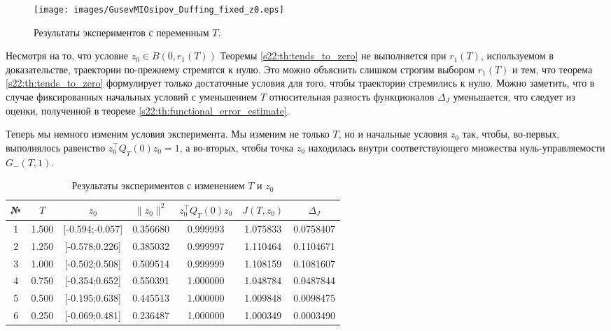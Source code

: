 \documentclass[../main.tex]{subfiles}
\begin{document}
\begin{figure}
    \centering
    \texttt{[image: images/GusevMIOsipov\_Duffing\_fixed\_z0.eps]}
    \caption{Результаты экспериментов с переменным $T$.}
    \label{s22:fig:series1}
\end{figure}

Несмотря на то, что условие $z_0 \in B(0,r_1(T))$ Теоремы \ref{s22:th:tends_to_zero} не выполняется при $r_1(T)$, используемом в доказательстве, траектории по-прежнему стремятся к нулю. 
Это можно объяснить слишком строгим выбором $r_1(T)$ и тем, что теорема \ref{s22:th:tends_to_zero} формулирует только достаточные условия для того, чтобы траектории стремились к нулю. 
Можно заметить, что в случае фиксированных начальных условий с уменьшением $T$ относительная разность функционалов $\Delta_J$ уменьшается, что следует из оценки, полученной в теореме \ref{s22:th:functional_error_estimate}.

Теперь мы немного изменим условия эксперимента. 
Мы изменим не только $T$, но и начальные условия $z_0$ так, чтобы, во-первых, выполнялось равенство 
$z_0^{\top} Q_T(0) z_0 = 1$, а во-вторых, чтобы точка $z_0$ находилась внутри 
соответствующего множества нуль-управляемости $G_{-}(T,1)$.


\begin{table}
\caption{Результаты экспериментов с изменением $T$ и $z_0$}
\label{s22:ExampleTable2}
\begin{center}
\begin{tabular}{c|c|c|c|c|c|c}
     № &    $T$  & $z_0$            & $\|z_0\|^2$&$z_0^{\top} Q_T(0) z_0$ &$J(T,z_0)$&$\Delta_J$ \\ \hline 
     1 &   1.500 & [-0.594;-0.057]  & 0.356680   & 0.999993    & 1.075833 & 0.0758407 \\ \hline
     2 &   1.250 & [-0.578;0.226]   & 0.385032   & 0.999997    & 1.110464 & 0.1104671 \\ \hline
     3 &   1.000 & [-0.502;0.508]   & 0.509514   & 0.999999    & 1.108159 & 0.1081607 \\ \hline
     4 &   0.750 & [-0.354;0.652]   & 0.550391   & 1.000000    & 1.048784 & 0.0487844 \\ \hline
     5 &   0.500 & [-0.195;0.638]   & 0.445513   & 1.000000    & 1.009848 & 0.0098475 \\ \hline
     6 &   0.250 & [-0.069;0.481]   & 0.236487   & 1.000000    & 1.000349 & 0.0003490 \\ \hline
\end{tabular}
\end{center}
\end{table} 
\end{document}
